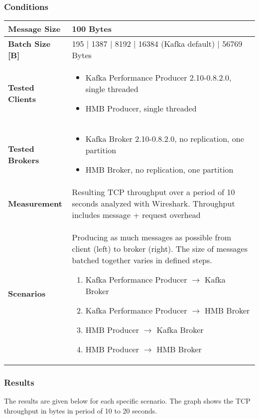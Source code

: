 \subsubsection{Conditions}
\begin{table}[H]
\begin{tabular}{|l| p{11.5cm}|} \hline
{\bf Message Size}   & 100 Bytes \\ \hline
{\bf Batch Size [B]} & 195 | 1387 | 8192 | 16384 (Kafka default) | 56769 Bytes \\ \hline
{\bf Tested Clients} &
    \begin{itemize}
        \item Kafka Performance Producer 2.10-0.8.2.0, single threaded
        \item HMB Producer, single threaded
    \end{itemize}\\ \hline
{\bf Tested Brokers} &
    \begin{itemize}
        \item Kafka Broker 2.10-0.8.2.0, no replication, one partition
        \item HMB Broker, no replication, one partition
    \end{itemize}\\ \hline
{\bf Measurement} & Resulting TCP throughput over a period of 10 seconds analyzed with
    Wireshark. Throughput includes message + request overhead\\ \hline
{\bf Scenarios} & Producing as much messages as possible from client (left) to broker (right).
    The size of messages batched together varies in defined steps.
    \begin{enumerate}
        \item Kafka Performance Producer $\rightarrow$ Kafka Broker
        \item Kafka Performance Producer $\rightarrow$ HMB Broker
        \item HMB Producer $\rightarrow$ Kafka Broker
        \item HMB Producer $\rightarrow$ HMB Broker
    \end{enumerate} \\ \hline
\end{tabular}
\end{table}
\newpage
\subsubsection{Results}
The results are given below for each specific scenario. The graph shows the
TCP throughput in bytes in period of 10 to 20 seconds.

